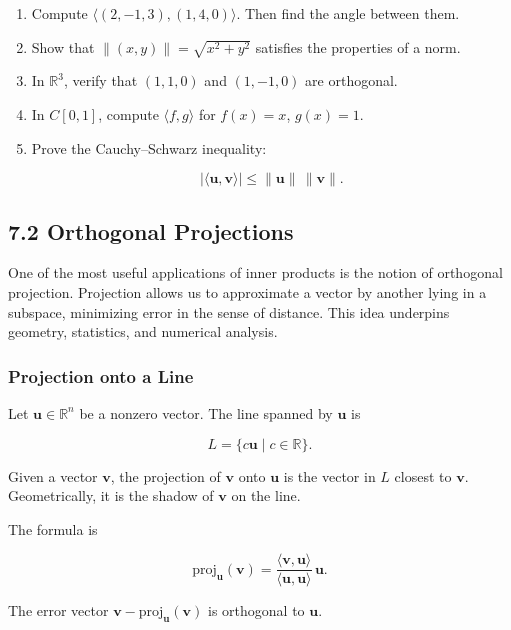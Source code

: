 \documentclass[
  12pt,
  a4paper,
]{article}
\begin{document}
\begin{enumerate}
\def\labelenumi{\arabic{enumi}.}
\item
  Compute \(\langle (2,-1,3), (1,4,0) \rangle\). Then find the angle
  between them.
\item
  Show that \(\|(x,y)\| = \sqrt{x^2+y^2}\) satisfies the properties of a
  norm.
\item
  In \(\mathbb{R}^3\), verify that \((1,1,0)\) and \((1,-1,0)\) are
  orthogonal.
\item
  In \(C[0,1]\), compute \(\langle f,g \rangle\) for \(f(x)=x\),
  \(g(x)=1\).
\item
  Prove the Cauchy--Schwarz inequality:

  \[|\langle \mathbf{u}, \mathbf{v} \rangle| \leq \|\mathbf{u}\| \, \|\mathbf{v}\|.\]
\end{enumerate}

\subsection{7.2 Orthogonal Projections}\label{72-orthogonal-projections}

One of the most useful applications of inner products is the notion of
orthogonal projection. Projection allows us to approximate a vector by
another lying in a subspace, minimizing error in the sense of distance.
This idea underpins geometry, statistics, and numerical analysis.

\subsubsection{Projection onto a Line}\label{projection-onto-a-line}

Let \(\mathbf{u} \in \mathbb{R}^n\) be a nonzero vector. The line
spanned by \(\mathbf{u}\) is

\[L = \{ c\mathbf{u} \mid c \in \mathbb{R} \}.\]

Given a vector \(\mathbf{v}\), the projection of \(\mathbf{v}\) onto
\(\mathbf{u}\) is the vector in \(L\) closest to \(\mathbf{v}\).
Geometrically, it is the shadow of \(\mathbf{v}\) on the line.

The formula is

\[\text{proj}_{\mathbf{u}}(\mathbf{v}) = \frac{\langle \mathbf{v}, \mathbf{u} \rangle}{\langle \mathbf{u}, \mathbf{u} \rangle} \, \mathbf{u}.\]

The error vector \(\mathbf{v} - \text{proj}_{\mathbf{u}}(\mathbf{v})\)
is orthogonal to \(\mathbf{u}\).
\end{document}
